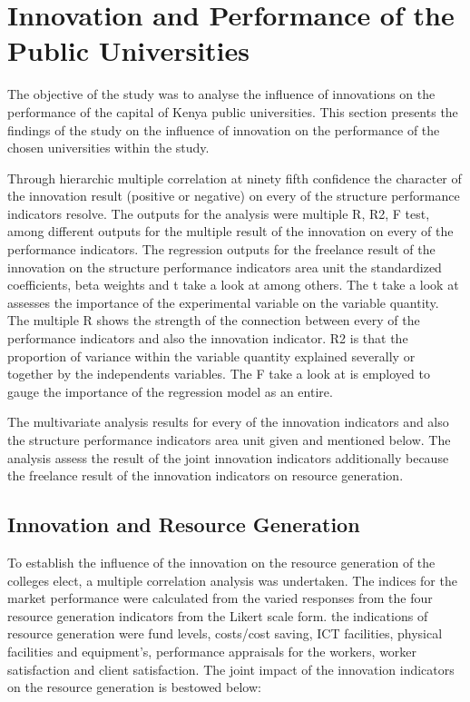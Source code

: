 \section{\textbf{Innovation and Performance of the Public Universities}}
The objective of the study was to analyse the influence of innovations on the performance of the capital of Kenya public universities. This section presents the findings of the study on the influence of innovation on the performance of the chosen universities within the study.

Through hierarchic multiple correlation at ninety fifth confidence the character of the innovation result (positive or negative) on every of the structure performance indicators resolve. The outputs for the analysis were multiple R, R2, F test, among different outputs for the multiple result of the innovation on every of the performance indicators. The regression outputs for the freelance result of the innovation on the structure performance indicators area unit the standardized coefficients, beta weights and t take a look at among others. The t take a look at assesses the importance of the experimental variable on the variable quantity. The multiple R shows the strength of the connection between every of the performance indicators and also the innovation indicator. R2 is that the proportion of variance within the variable quantity explained severally or together by the independents variables. The F take a look at is employed to gauge the importance of the regression model as an entire.

The multivariate analysis results for every of the innovation indicators and also the structure performance indicators area unit given and mentioned below. The analysis assess the result of the joint innovation indicators additionally because the freelance result of the innovation indicators on resource generation.

\subsection{\textbf{Innovation and Resource Generation}}
To establish the influence of the innovation on the resource generation of the colleges elect, a multiple correlation analysis was undertaken. The indices for the market performance were calculated from the varied responses from the four resource generation indicators from the Likert scale form. the indications of resource generation were fund levels, costs/cost saving, ICT facilities, physical facilities and equipment’s, performance appraisals for the workers, worker satisfaction and client satisfaction. The joint impact of the innovation indicators on the resource generation is bestowed below:

